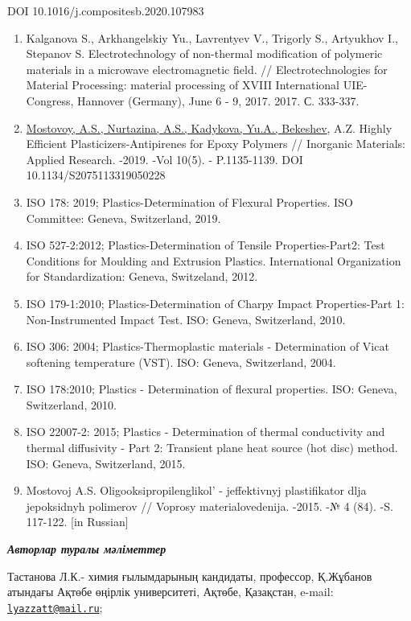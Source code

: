 DOI 10.1016/j.compositesb.2020.107983

\begin{enumerate}
\def\labelenumi{\arabic{enumi}.}
\setcounter{enumi}{20}
\item
  Kalganova S., Arkhangelskiy Yu., Lavrentyev V., Trigorly S., Artyukhov
  I., Stepanov S. Electrotechnology of non-thermal modification of
  polymeric materials in a microwave electromagnetic field. //
  Electrotechnologies for Material Processing: material processing of
  XVIII International UIE-Congress, Hannover (Germany), June 6 - 9,
  2017. 2017. С. 333-337.
\item
  \href{https://www.en.j-pm.ru/kopiya-2019-1-articles1-7}{Mostovoy,
  A.S., Nurtazina, A.S., Kadykova, Yu.A., Bekeshev}, A.Z. Highly
  Efficient Plasticizers-Antipirenes for Epoxy Polymers // Inorganic
  Materials: Applied Research. -2019. -Vol 10(5). - P.1135-1139. DOI
  10.1134/S2075113319050228
\item
  ISO 178: 2019; Plastics-Determination of Flexural Properties. ISO
  Committee: Geneva, Switzerland, 2019.
\item
  ISO 527-2:2012; Plastics-Determination of Tensile Properties-Part2:
  Test Conditions for Moulding and Extrusion Plastics. International
  Organization for Standardization: Geneva, Switzeland, 2012.
\item
  ISO 179-1:2010; Plastics-Determination of Charpy Impact
  Properties-Part 1: Non-Instrumented Impact Test. ISO: Geneva,
  Switzerland, 2010.
\item
  ISO 306: 2004; Plastics-Thermoplastic materials - Determination of
  Vicat softening temperature (VST). ISO: Geneva, Switzerland, 2004.
\item
  ISO 178:2010; Plastics - Determination of flexural properties. ISO:
  Geneva, Switzerland, 2010.
\item
  ISO 22007-2: 2015; Plastics - Determination of thermal conductivity
  and thermal diffusivity - Part 2: Transient plane heat source (hot
  disc) method. ISO: Geneva, Switzerland, 2015.
\item
  Mostovoj A.S. Oligooksipropilenglikol'{} - jeffektivnyj
  plastifikator dlja jepoksidnyh polimerov // Voprosy materialovedenija.
  -2015. -№ 4 (84). -S. 117-122. {[}in Russian{]}
\end{enumerate}

\emph{{\bfseries Авторлар туралы мәліметтер}}

Тастанова Л.К.- химия ғылымдарының кандидаты, профессор, Қ.Жұбанов
атындағы Ақтөбе өңірлік университеті, Ақтөбе, Қазақстан, e-mail:
\href{mailto:lyazzatt@mail.ru}{\nolinkurl{lyazzatt@mail.ru}};

